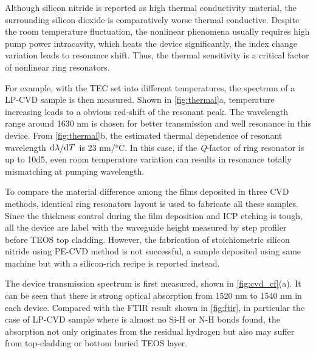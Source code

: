\begin{figure}
	\centering
	
	\label{fig:thermal}
\end{figure}

Although silicon nitride is reported as high thermal conductivity material, the surrounding silicon dioxide is comparatively worse thermal conductive. Despite the room temperature fluctuation, the nonlinear phenomena usually requires high pump power intracavity, which heats the device significantly, the index change variation leads to resonance shift. Thus, the thermal sensitivity is a critical factor of nonlinear ring resonators.

For example, with the TEC set into different temperatures, the spectrum of a LP-CVD sample is then measured. Shown in \autoref{fig:thermal}a, temperature increasing leads to a obvious red-shift of the resonant peak. The wavelength range around 1630 nm is chosen for better transmission and well resonance in this device. From \autoref{fig:thermal}b, the estimated thermal dependence of resonant wavelength $\dv*{\lambda}{T}$ is 23 \si{\nm/\celsius}. In this case, if the \textit{Q}-factor of ring resonator is up to \num{10d5}, even room temperature variation can results in resonance totally mismatching at pumping wavelength.






To compare the material difference among the films deposited in three CVD methods, identical ring resonators layout is used to fabricate all these samples. %
Since the thickness control during the film deposition and ICP etching is tough, all the device are label with the waveguide height measured by step profiler before TEOS top cladding. However, the fabrication of stoichiometric silicon nitride using PE-CVD method is not successful, a sample deposited using same machine but with a silicon-rich recipe is reported instead. 

The device transmission spectrum is first measured, shown in \autoref{fig:cvd_cf}(a). It can be seen that there is strong optical absorption from 1520 nm to 1540 nm in each device. Compared with the FTIR result shown in \autoref{fig:ftir}, in particular the case of LP-CVD sample where is almost no Si-H or N-H bonds found, the absorption not only originates from the residual hydrogen but also may suffer from top-cladding or bottom buried TEOS layer. 

